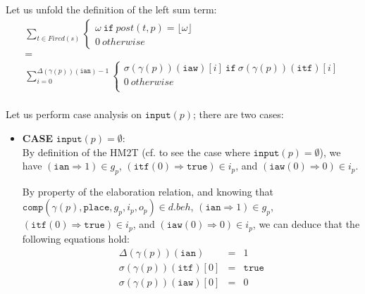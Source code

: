 \begin{pf}
  \bigskip
  
  \noindent{}Let us unfold the definition of the left sum term:\\
  \begin{equation*}
    \boxed{\begin{array}{c}
      \sum\limits_{t\in{}Fired(s)}
      \begin{cases}
        \omega~\mathtt{if}~post(t,p)=\lfloor\omega\rfloor \\
        0~otherwise
      \end{cases} \\
      = \\
      \sum\limits_{i=0}^{\Delta(\gamma(p))(\texttt{ian})-1}
      \begin{cases}
        \sigma(\gamma(p))(\texttt{iaw})[i]~\mathtt{if}~\sigma(\gamma(p))(\texttt{itf})[i]\\
        0~otherwise \\
      \end{cases} \\
    \end{array}}
  \end{equation*}

  \bigskip
  
  \noindent{}Let us perform case analysis on $\mathtt{input}(p)$;
  there are two cases:

  \begin{itemize}
  \item \textbf{CASE} $\mathtt{input}(p)=\emptyset$:\\
    
    By definition of the HM2T (cf. \cite{Iampietro2022hfspec} to see
    the case where $\mathtt{input}(p)=\emptyset$), we have
    $(\mathtt{ian}\Rightarrow{}1)\in{}g_p$,
    $(\mathtt{itf}(0)\Rightarrow{}\mathtt{true})\in{}i_p$, and
    $(\mathtt{iaw}(0)\Rightarrow{}0)\in{}i_p$.

    By property of the elaboration relation, and knowing that
    $\mathtt{comp}(\gamma(p),\mathtt{place},g_p,i_p,o_p)\in{}d.beh$,
    $(\mathtt{ian}\Rightarrow{}1)\in{}g_p$,
    $(\mathtt{itf}(0)\Rightarrow{}\mathtt{true})\in{}i_p$, and
    $(\mathtt{iaw}(0)\Rightarrow{}0)\in{}i_p$, we can deduce that the
    following equations hold:
    \begin{eqnarray}
      \label{eq:eq-ian-itfz-iawz-0}
      \Delta(\gamma(p))(\texttt{ian})&=&1 \\
      \label{eq:eq-ian-itfz-iawz-1}\sigma(\gamma(p))(\texttt{itf})[0]&=&\mathtt{true} \\
      \label{eq:eq-ian-itfz-iawz-2}\sigma(\gamma(p))(\texttt{iaw})[0]&=&0
    \end{eqnarray}


\end{itemize}
\end{pf}
